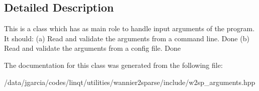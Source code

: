 \subsection{Detailed Description}
This is a class which has as main role to handle input arguments of the program. It should\+: (a) Read and validate the arguments from a command line. Done (b) Read and validate the arguments from a config file. Done 

The documentation for this class was generated from the following file\+:\begin{DoxyCompactItemize}
\item 
/data/jgarcia/codes/linqt/utilities/wannier2sparse/include/w2sp\+\_\+arguments.\+hpp\end{DoxyCompactItemize}
